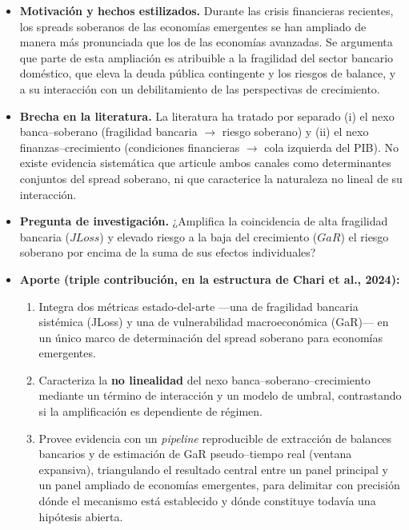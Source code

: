 \documentclass[5p,times,twocolumn,authoryear]{elsarticle}
\begin{document}
\begin{itemize}
    \item \textbf{Motivación y hechos estilizados.} Durante las crisis financieras recientes, los spreads soberanos de las economías emergentes se han ampliado de manera más pronunciada que los de las economías avanzadas. Se argumenta que parte de esta ampliación es atribuible a la fragilidad del sector bancario doméstico, que eleva la deuda pública contingente y los riesgos de balance, y a su interacción con un debilitamiento de las perspectivas de crecimiento.
    \item \textbf{Brecha en la literatura.} La literatura ha tratado por separado (i) el nexo banca–soberano (fragilidad bancaria $\rightarrow$ riesgo soberano) y (ii) el nexo finanzas–crecimiento (condiciones financieras $\rightarrow$ cola izquierda del PIB). No existe evidencia sistemática que articule ambos canales como determinantes conjuntos del spread soberano, ni que caracterice la naturaleza no lineal de su interacción.
    \item \textbf{Pregunta de investigación.} ¿Amplifica la coincidencia de alta fragilidad bancaria ($JLoss$) y elevado riesgo a la baja del crecimiento ($GaR$) el riesgo soberano por encima de la suma de sus efectos individuales?
    \item \textbf{Aporte (triple contribución, en la estructura de Chari et al., 2024):}
    \begin{enumerate}
        \item Integra dos métricas estado-del-arte —una de fragilidad bancaria sistémica (JLoss) y una de vulnerabilidad macroeconómica (GaR)— en un único marco de determinación del spread soberano para economías emergentes.
        \item Caracteriza la \textbf{no linealidad} del nexo banca–soberano–crecimiento mediante un término de interacción y un modelo de umbral, contrastando si la amplificación es dependiente de régimen.
        \item Provee evidencia con un \textit{pipeline} reproducible de extracción de balances bancarios y de estimación de GaR pseudo–tiempo real (ventana expansiva), triangulando el resultado central entre un panel principal y un panel ampliado de economías emergentes, para delimitar con precisión dónde el mecanismo está establecido y dónde constituye todavía una hipótesis abierta.
    \end{enumerate}

\end{itemize}
\end{document}
